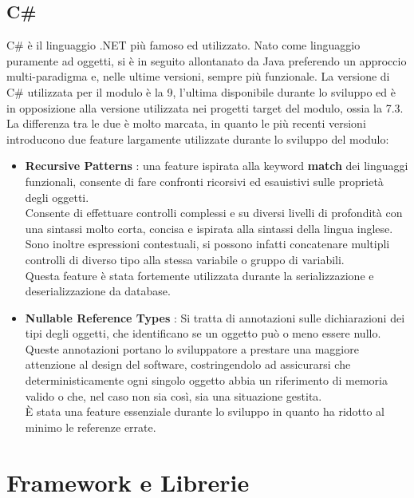 \documentclass[\main/Tesi.tex]{subfiles}
\begin{document}
\subsection{C\#}
C\# è il linguaggio .NET più famoso ed utilizzato. Nato come linguaggio puramente ad oggetti, si è in seguito allontanato da Java preferendo un approccio multi-paradigma e, nelle ultime versioni, sempre più funzionale.
La versione di C\# utilizzata per il modulo è la 9, l'ultima disponibile durante lo sviluppo ed è in opposizione alla versione utilizzata nei progetti target del modulo, ossia la 7.3.\\
La differenza tra le due è molto marcata, in quanto le più recenti versioni introducono due feature largamente utilizzate durante lo sviluppo del modulo:
\begin{itemize}
    \item \textbf{Recursive Patterns} \cite{recursivepatterns}: una feature ispirata alla keyword \textbf{match} dei linguaggi funzionali, consente di fare confronti ricorsivi ed esauistivi sulle proprietà degli oggetti.\\Consente di effettuare controlli complessi e su diversi livelli di profondità con una sintassi molto corta, concisa e ispirata alla sintassi della lingua inglese.\\Sono inoltre espressioni contestuali, si possono infatti concatenare multipli controlli di diverso tipo alla stessa variabile o gruppo di variabili.\\Questa feature è stata fortemente utilizzata durante la serializzazione e deserializzazione da database.
    \item \textbf{Nullable Reference Types} \cite{nullable}: Si tratta di annotazioni sulle dichiarazioni dei tipi degli oggetti, che identificano se un oggetto può o meno essere nullo.\\Queste annotazioni portano lo sviluppatore a prestare una maggiore attenzione al design del software, costringendolo ad assicurarsi che deterministicamente ogni singolo oggetto abbia un riferimento di memoria valido o che, nel caso non sia così, sia una situazione gestita.\\È stata una feature essenziale durante lo sviluppo in quanto ha ridotto al minimo le referenze errate.
\end{itemize}

\section{Framework e Librerie}
\end{document}

